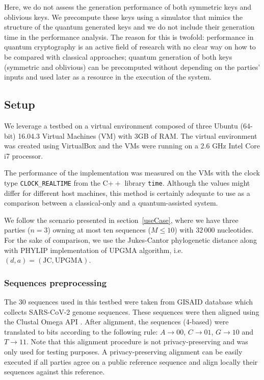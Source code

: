 Here, we do not assess the generation performance of both symmetric keys and oblivious keys. We precompute these keys using a simulator that mimics the structure of the quantum generated keys and we do not include their generation time in the performance analysis. The reason for this is twofold: performance in quantum cryptography is an active field of research with no clear way on how to be compared with classical approaches; quantum generation of both keys (symmetric and oblivious) can be precomputed without depending on the parties' inputs and used later as a resource in the execution of the system.

\subsection{Setup}

We leverage a testbed on a virtual environment composed of three Ubuntu (64-bit) 16.04.3 Virtual Machines (VM) with 3GB of RAM. The virtual environment was created using VirtualBox and the VMs were running on a 2.6 GHz Intel Core i7 processor.

The performance of the implementation was measured on the VMs with the clock type \texttt{CLOCK\_REALTIME} from the C$++$ library \texttt{time}. Although the values might differ for different host machines, this method is certainly adequate to use as a comparison between a classical-only and a quantum-assisted system.

We follow the scenario presented in section~\ref{useCase}, where we have three parties ($n=3$) owning at most ten sequences ($M\leq10$) with $32\,000$ nucleotides. For the sake of comparison, we use the Jukes-Cantor phylogenetic distance along with PHYLIP implementation of UPGMA algorithm, i.e. $(d, a) = (\text{JC}, \text{UPGMA})$.

\subsubsection{Sequences preprocessing}

The $30$ sequences used in this testbed were taken from GISAID database \cite{GISAID} which collects SARS-CoV-2 genome sequences. These sequences were then aligned using the Clustal Omega API \cite{MPL19}. After alignment, the sequences (4-based) were translated to bits according to the following rule: $A \rightarrow 00$, $C \rightarrow 01$, $G \rightarrow 10$ and $T \rightarrow 11$. Note that this alignment procedure is not privacy-preserving and was only used for testing purposes. A privacy-preserving alignment can be easily executed if all parties agree on a public reference sequence and align locally their sequences against this reference.


